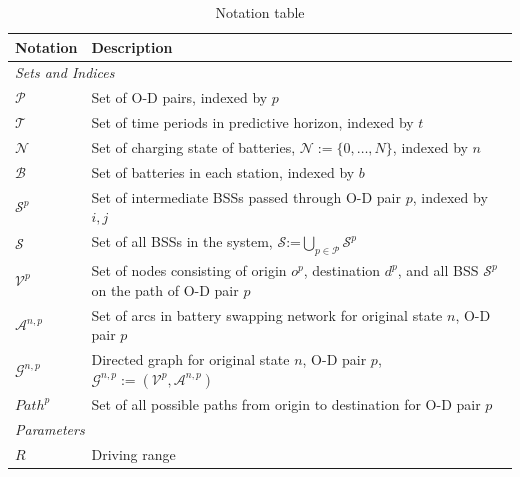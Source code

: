 \documentclass[12pt,hyperref,a4paper,UTF8]{ctexart}
\begin{document}

\begin{table}[!htbp]
  \centering
  \caption{Notation table}
  \label{tab:notation}
  \small
  \begin{tabular}{@{}lp{12cm}@{}}
    \toprule
    \textbf{Notation} & \textbf{Description} \\
    \midrule
    \multicolumn{2}{l}{\textit{Sets and Indices}} \\
    $\mathcal{P}$ & Set of O-D pairs, indexed by $p$\\
    $\mathcal{T}$ & Set of time periods in predictive horizon, indexed by $t$ \\
    $\mathcal{N}$ & Set of charging state of batteries, $\mathcal{N}:=\{0,\dots,N\}$, indexed by $n$\\
    $\mathcal{B}$ & Set of batteries in each station, indexed by $b$ \\
    $\mathcal{S}^p$ & Set of intermediate BSSs passed through O-D pair $p$, indexed by $i, j$ \\
    $\mathcal{S}$ & Set of all BSSs in the system, $\mathcal{S}$:=$\bigcup_{p \in \mathcal{P}}\mathcal{S}^p$\\
    $\mathcal{V}^p$ & Set of nodes consisting of origin $o^p$, destination $d^p$, and all BSS $\mathcal{S}^p$ on the path of O-D pair $p$ \\  
    $\mathcal{A}^{n,p}$ & Set of arcs in battery swapping network for original state $n$, O-D pair $p$ \\
    $\mathcal{G}^{n,p}$ & Directed graph for original state $n$, O-D pair $p$, $\mathcal{G}^{n,p}:=(\mathcal{V}^p,\mathcal{A}^{n,p})$ \\
    $Path^p$ & Set of all possible paths from origin to destination for O-D pair $p$ \\
    \midrule
    \multicolumn{2}{l}{\textit{Parameters}} \\
    $R$ & Driving range \\

\end{tabular}
\end{table}
\end{document}
